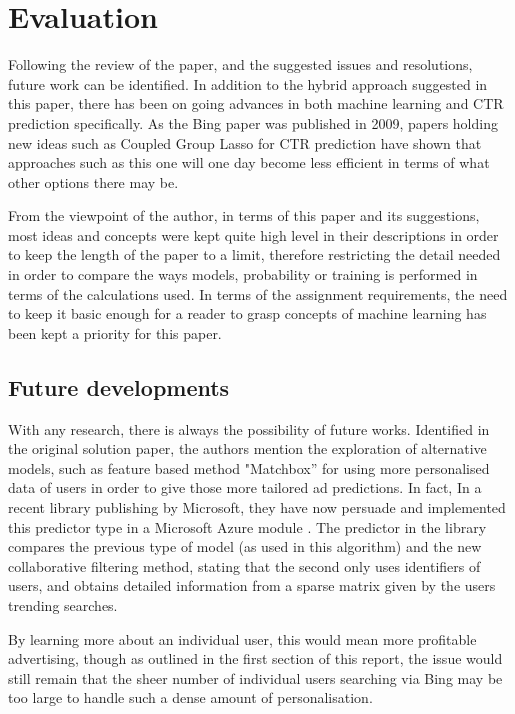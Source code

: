 \documentclass[journal]{IEEEtran}
\begin{document}
\section{Evaluation}
Following the review of the paper, and the suggested issues and resolutions, future work can be identified. In addition to the hybrid approach suggested in this paper, there has been on going advances in both machine learning and CTR prediction specifically. As the Bing paper was published in 2009, papers holding new ideas such as Coupled Group Lasso for CTR prediction have shown that approaches such as this one will one day become less efficient in terms of what other options there may be. \par
From the viewpoint of the author, in terms of this paper and its suggestions, most ideas and concepts were kept quite high level in their descriptions in order to keep the length of the paper to a limit, therefore restricting the detail needed in order to compare the ways models, probability or training is performed in terms of the calculations used. In terms of the assignment requirements, the need to keep it basic enough for a reader to grasp concepts of machine learning has been kept a priority for this paper.

\subsection{Future developments}
With any research, there is always the possibility of future works. Identified in the original solution paper, the authors mention the exploration of alternative models, such as feature based method "Matchbox” for using more personalised data of users in order to give those more tailored ad predictions. In fact, In a recent library publishing by Microsoft, they have now persuade and implemented this predictor type in a Microsoft Azure module \cite{azure}. The predictor in the library compares the previous type of model (as used in this algorithm) and the new collaborative filtering method, stating that the second only uses identifiers of users, and obtains detailed information from a sparse matrix given by the users trending searches. \par
By learning more about an individual user, this would mean more profitable advertising, though as outlined in the first section of this report, the issue would still remain that the sheer number of individual users searching via Bing may be too large to handle such a dense amount of personalisation.
\end{document}
